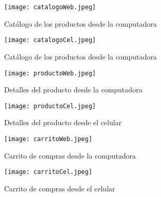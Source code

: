 \documentclass[conference]{IEEEtran}
\begin{document}
	\begin{figure}[htbp]
		\centering
		\texttt{[image: catalogoWeb.jpeg]}
		\caption{Catálogo de los productos desde la computadora}
		\label{fig: Catálogo de los productos desde la computadora.}
	\end{figure}
	
	\begin{figure}[htbp]
		\centering
		\texttt{[image: catalogoCel.jpeg]}
		\caption{Catálogo de los productos desde la computadora}
		\label{fig: Catálogo de los productos desde el celular.}
	\end{figure}
	
	\begin{figure}[htbp]
		\centering
		\texttt{[image: productoWeb.jpeg]}
		\caption{Detalles del producto desde la computadora}
		\label{fig: Detalles del producto desde la computadora.}
	\end{figure}
	
	\begin{figure}[htbp]
		\centering
		\texttt{[image: productoCel.jpeg]}
		\caption{Detalles del producto desde el celular}
		\label{fig: Detalles del producto desde el celular.}
	\end{figure}

	\begin{figure}[htbp]
		\centering
		\texttt{[image: carritoWeb.jpeg]}
		\caption{Carrito de compras desde la computadora}
		\label{fig: Carrito de compras desde la computadora.}
	\end{figure}

	\begin{figure}[htbp]
		\centering
		\texttt{[image: carritoCel.jpeg]}
		\caption{Carrito de compras desde el celular}
		\label{fig: Carrito de compras desde el celular.}
	\end{figure}
	
\end{document}
